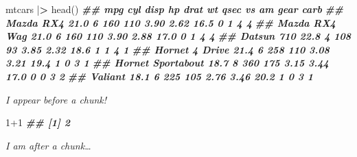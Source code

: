 \documentclass[
  11pt,
]{article}
\newenvironment{Shaded}{\begin{snugshade}}{\end{snugshade}}
\newcommand{\AttributeTok}[1]{\textcolor[rgb]{0.77,0.63,0.00}{#1}}
\newcommand{\CommentTok}[1]{\textcolor[rgb]{0.56,0.35,0.01}{\textit{#1}}}
\newcommand{\ControlFlowTok}[1]{\textcolor[rgb]{0.13,0.29,0.53}{\textbf{#1}}}
\newcommand{\DecValTok}[1]{\textcolor[rgb]{0.00,0.00,0.81}{#1}}
\newcommand{\DocumentationTok}[1]{\textcolor[rgb]{0.56,0.35,0.01}{\textbf{\textit{#1}}}}
\newcommand{\ErrorTok}[1]{\textcolor[rgb]{0.64,0.00,0.00}{\textbf{#1}}}
\newcommand{\FunctionTok}[1]{\textcolor[rgb]{0.00,0.00,0.00}{#1}}
\newcommand{\NormalTok}[1]{#1}
\newcommand{\SpecialCharTok}[1]{\textcolor[rgb]{0.00,0.00,0.00}{#1}}
\newcommand{\StringTok}[1]{\textcolor[rgb]{0.31,0.60,0.02}{#1}}
\begin{document}
\tiny

\begin{Shaded}
\begin{Highlighting}[]
\NormalTok{mtcars }\SpecialCharTok{|}\ErrorTok{\textgreater{}} \FunctionTok{head}\NormalTok{()}
      \DocumentationTok{\#\#                    mpg cyl disp  hp drat   wt qsec vs am gear carb}
      \DocumentationTok{\#\# Mazda RX4         21.0   6  160 110 3.90 2.62 16.5  0  1    4    4}
      \DocumentationTok{\#\# Mazda RX4 Wag     21.0   6  160 110 3.90 2.88 17.0  0  1    4    4}
      \DocumentationTok{\#\# Datsun 710        22.8   4  108  93 3.85 2.32 18.6  1  1    4    1}
      \DocumentationTok{\#\# Hornet 4 Drive    21.4   6  258 110 3.08 3.21 19.4  1  0    3    1}
      \DocumentationTok{\#\# Hornet Sportabout 18.7   8  360 175 3.15 3.44 17.0  0  0    3    2}
      \DocumentationTok{\#\# Valiant           18.1   6  225 105 2.76 3.46 20.2  1  0    3    1}
\end{Highlighting}
\end{Shaded}

\normalsize

\begin{Shaded}
\end{Shaded}

\hline

\tiny \emph{I appear before a chunk!}

\begin{Shaded}
\begin{Highlighting}[]
\DecValTok{1}\SpecialCharTok{+}\DecValTok{1}
      \DocumentationTok{\#\# [1] 2}
\end{Highlighting}
\end{Shaded}

\normalsize

\emph{I am after a chunk\ldots{}}
\end{document}
